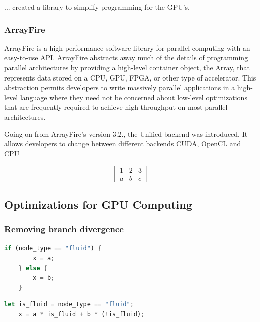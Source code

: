 ... created a library to simplify programming for the GPU's. 

\citep{Yalamanchili2015}

\subsubsection{ArrayFire}

ArrayFire is a high performance software library for parallel computing with an easy-to-use API. ArrayFire abstracts away much of the details of programming parallel architectures by providing a high-level container object, the Array, that represents data stored on a CPU, GPU, FPGA, or other type of accelerator. This abstraction permits developers to write massively parallel applications in a high-level language where they need not be concerned about low-level optimizations that are frequently required to achieve high throughput on most parallel architectures.

\citep{Yalamanchili2015}

Going on from ArrayFire's version 3.2., the Unified backend was introduced. It allows developers to change between different backends CUDA, OpenCL and CPU

\begin{equation}
\begin{bmatrix}
	1 & 2 & 3\\
	a & b & c
\end{bmatrix}
\end{equation}

\subsection{Optimizations for GPU Computing}
\label{sec:optimizations-for-gpu-computing}

\subsubsection{Removing branch divergence}

\begin{lstlisting}[language=Rust, caption=Pseudo-code of if-statement in kernel]
	if (node_type == "fluid") {
		x = a;
	} else {
		x = b;
	}
\end{lstlisting}

\begin{lstlisting}[language=Rust, caption=Pseudo-code with if-statement removed]
	let is_fluid = node_type == "fluid";
	x = a * is_fluid + b * (!is_fluid);
\end{lstlisting}


